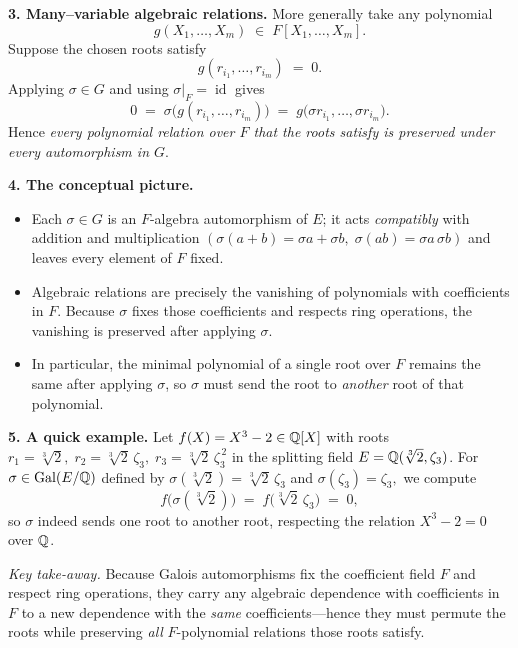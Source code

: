 \documentclass[12pt]{article}
\theoremstyle{definition} %
\theoremstyle{plain} %
\begin{document}
\bigskip
\textbf{3.  Many–variable algebraic relations.}\;
More generally take any polynomial
\[
   g(X_1,\dots,X_m)\;\in\;F[X_1,\dots,X_m].
\]
Suppose the chosen roots satisfy
\[
   g(r_{i_1},\dots,r_{i_m})\;=\;0.
\]
Applying \(\sigma\in G\) and using \(\sigma|_F=\operatorname{id}\) gives
\[
   0
   \;=\;
   \sigma\!\bigl(g(r_{i_1},\dots,r_{i_m})\bigr)
   \;=\;
   g\!\bigl(\sigma r_{i_1},\dots,\sigma r_{i_m}\bigr).
\]
Hence \emph{every polynomial relation over \(F\) that the roots satisfy
is preserved under every automorphism in \(G\)}.

\bigskip
\textbf{4.  The conceptual picture.}
\begin{itemize}
   \item Each \(\sigma\in G\) is an \(F\)-algebra automorphism of \(E\);
         it acts \emph{compatibly} with addition and multiplication
         \((\sigma(a+b)=\sigma a+\sigma b,\;\sigma(ab)=\sigma a\,\sigma b)\)
         and leaves every element of \(F\) fixed.
   \item Algebraic relations are precisely the vanishing of polynomials
         with coefficients in \(F\).  Because \(\sigma\) fixes those
         coefficients and respects ring operations, the vanishing is
         preserved after applying \(\sigma\).
   \item In particular, the minimal polynomial of a single root over
         \(F\) remains the same after applying \(\sigma\), so \(\sigma\)
         must send the root to \emph{another} root of that polynomial.
\end{itemize}

\bigskip
\textbf{5.  A quick example.}  
Let \(f(X)=X^3-2\in\Bbb Q[X]\) with roots  
\(r_1=\sqrt[3]{2},\;r_2=\sqrt[3]{2}\,\zeta_3,\;
  r_3=\sqrt[3]{2}\,\zeta_3^{\,2}\)
in the splitting field \(E=\Bbb Q(\sqrt[3]{2},\zeta_3)\).
For \(\sigma\in\operatorname{Gal}(E/\Bbb Q)\) defined by
\(\sigma(\sqrt[3]{2})=\sqrt[3]{2}\,\zeta_3\) and
\(\sigma(\zeta_3)=\zeta_3,\) we compute
\[
   f\!\bigl(\sigma(\sqrt[3]{2})\bigr)
   \;=\;
   f\!\bigl(\sqrt[3]{2}\,\zeta_3\bigr)
   \;=\;
   0,
\]
so \(\sigma\) indeed sends one root to another root, respecting the
relation \(X^3-2=0\) over \(\Bbb Q\).

\bigskip
\noindent
\emph{Key take-away.}\;
Because Galois automorphisms fix the coefficient field \(F\) and respect
ring operations, they carry any algebraic dependence with coefficients
in \(F\) to a new dependence with the \emph{same} coefficients—hence
they must permute the roots while preserving \emph{all}
\(F\)-polynomial relations those roots satisfy.
\end{document}
